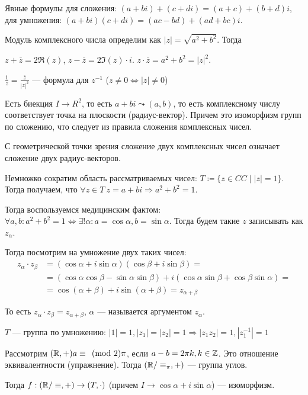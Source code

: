  Явные формулы для сложения: $(a+bi) + (c+di) = (a+c)+(b+d)i$, для умножения:  $(a + bi)(c + di) = (ac - bd) + (ad + bc)i$.

 Модуль комплексного числа определим как $|z| = \sqrt{a^2 + b^2}$. Тогда


 $z + \overline{z} = 2\Re(z)$,  $z - \overline{z} = 2 \Im(z) \cdot i$.  $z \cdot \overline{z} = a^2 + b^2 = |z|^2$.

 $\frac{1}{z} = \frac{\overline{z}}{|z|^2}$ --- формула для $z^{-1}$ ($z \neq 0 \iff |z| \neq 0$)  

Есть биекция $I \to R^2$, то есть  $a+bi \leadsto (a, b)$, то  есть комплексному числу соответствует точка на плоскости (радиус-вектор). Причем это изоморфизм групп по сложению, что следует из правила сложения комплексных чисел. 

С геометрической точки зрения сложение двух комплексных чисел означает сложение двух радиус-векторов.

Немножко сократим область рассматриваемых чисел: $T \coloneqq \{ z \in CC \mid |z| = 1\}$. Тогда получаем, что  $\forall z \in T\ z=a+bi \Rightarrow a^2+b^2=1$. 

Тогда воспользуемся медицинским фактом:  $\forall a, b\!: a^2 + b^2=1 \iff \exists! \alpha\!: a = \cos \alpha, b = \sin \alpha$. Тогда будем такие $z$ записывать как $z_\alpha$.

Тогда посмотрим на умножение двух таких чисел: \begin{align*}
    z_\alpha\cdot z_\beta &= (\cos \alpha + i\sin \alpha)(\cos \beta + i \sin \beta) =\\
                          &= (\cos \alpha \cos \beta - \sin \alpha \sin \beta) + i(\cos \alpha \sin \beta + \cos \beta \sin \alpha) = \\
                          &= \cos(\alpha + \beta) + i\sin(\alpha + \beta) = z_{\alpha+\beta}
\end{align*}

То есть $z_\alpha \cdot z_\beta = z_{\alpha+\beta}$,  $\alpha$ --- называется аргументом  $z_{\alpha}$. 
 \begin{remark}
     $T$ --- группа по умножению:  $|1| = 1, |z_1|=|z_2|=1 \Rightarrow |z_1z_2| = 1, |z_{1}^{-1}|=1$
\end{remark}
Рассмотрим $(\mathbb{R}, +) a \equiv \pmod 2\pi$, если  $a-b=2\pi k, k \in \mathbb{Z}$. Это отношение эквивалентности (упражнение). Тогда $(\mathbb{R} / \equiv_\pi, +)$ --- группа углов.

Тогда  $f: (\mathbb{R} / \equiv, +) \to (T, \cdot)$ (причем $I \to \cos \alpha + i \sin \alpha$) --- изоморфизм. 

